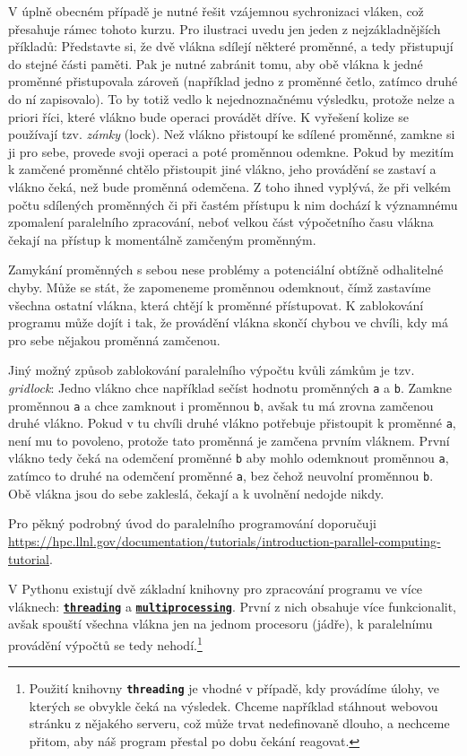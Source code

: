 \documentclass[a4paper,11pt,twoside]{article}
\def\code#1{\textnormal{\texttt{#1}}}
\def\file#1{\textnormal{\textbf{\texttt{#1}}}}
\theoremstyle{red}
\theoremstyle{green}
\begin{document}
    V úplně obecném případě je nutné řešit vzájemnou sychronizaci vláken, což přesahuje rámec tohoto kurzu. 
    Pro ilustraci uvedu jen jeden z nejzákladnějších příkladů: 
    Představte si, že dvě vlákna sdílejí některé proměnné, a tedy přistupují do stejné části paměti. 
    Pak je nutné zabránit tomu, aby obě vlákna k jedné proměnné přistupovala zároveň (například jedno z proměnné četlo, zatímco druhé do ní zapisovalo).
    To by totiž vedlo k nejednoznačnému výsledku, protože nelze a priori říci, které vlákno bude operaci provádět dříve. 
    K vyřešení kolize se používají tzv. \emph{zámky} (lock).
    Než vlákno přistoupí ke sdílené proměnné, zamkne si ji pro sebe, provede svoji operaci a poté proměnnou odemkne.
    Pokud by mezitím k zamčené proměnné chtělo přistoupit jiné vlákno, jeho provádění se zastaví a vlákno čeká, než bude proměnná odemčena.
    Z toho ihned vyplývá, že při velkém počtu sdílených proměnných či při častém přístupu k nim dochází k významnému zpomalení paralelního zpracování, neboť velkou část výpočetního času vlákna čekají na přístup k momentálně zamčeným proměnným.

    Zamykání proměnných s sebou nese problémy a potenciální obtížně odhalitelné chyby.
    Může se stát, že zapomeneme proměnnou odemknout, čímž zastavíme všechna ostatní vlákna, která chtějí k proměnné přístupovat.
    K zablokování programu může dojít i tak, že provádění vlákna skončí chybou ve chvíli, kdy má pro sebe nějakou proměnná zamčenou. 

    Jiný možný způsob zablokování paralelního výpočtu kvůli zámkům je tzv. \emph{gridlock}: Jedno vlákno chce například sečíst hodnotu proměnných \code{a} a \code{b}.
    Zamkne proměnnou \code{a} a chce zamknout i proměnnou \code{b}, avšak tu má zrovna zamčenou druhé vlákno.
    Pokud v tu chvíli druhé vlákno potřebuje přistoupit k proměnné \code{a}, není mu to povoleno, protože tato proměnná je zamčena prvním vláknem.
    První vlákno tedy čeká na odemčení proměnné \code{b} aby mohlo odemknout proměnnou \code{a}, zatímco to druhé na odemčení proměnné \code{a}, bez čehož neuvolní proměnnou \code{b}. 
    Obě vlákna jsou do sebe zakleslá, čekají a k uvolnění nedojde nikdy.    

    Pro pěkný podrobný úvod do paralelního programování doporučuji \url{https://hpc.llnl.gov/documentation/tutorials/introduction-parallel-computing-tutorial}.

    V Pythonu existují dvě základní knihovny pro zpracování programu ve více vláknech: \file{\href{https://docs.python.org/3/library/threading.html}{threading}} a \file{\href{https://docs.python.org/3/library/multiprocessing.html}{multiprocessing}}.
    První z nich obsahuje více funkcionalit, avšak spouští všechna vlákna jen na jednom procesoru (jádře), k paralelnímu provádění výpočtů se tedy nehodí.\footnote{
        Použití knihovny \file{threading} je vhodné v případě, kdy provádíme úlohy, ve kterých se obvykle čeká na výsledek.
        Chceme například stáhnout webovou stránku z nějakého serveru, což může trvat nedefinovaně dlouho, a nechceme přitom, aby náš program přestal po dobu čekání reagovat.
    }
\end{document}
